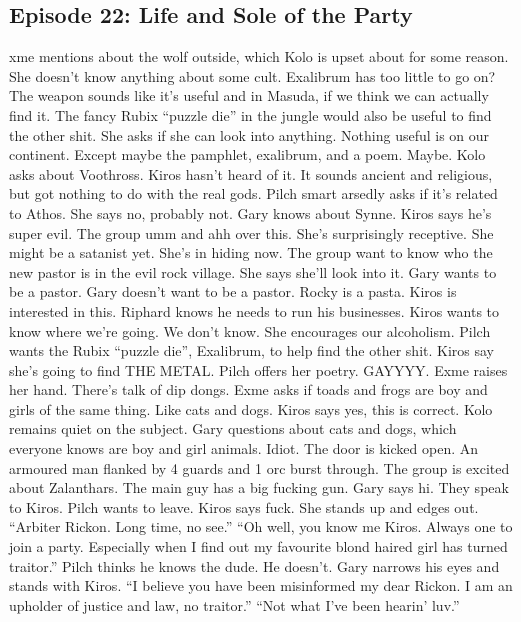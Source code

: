 \subsection{Episode 22: Life and Sole of the Party}
xme mentions about the wolf outside, which Kolo is upset about for some reason.\medskip
She doesn’t know anything about some cult. Exalibrum has too little to go on? The weapon sounds like it’s useful and in Masuda, if we think we can actually find it. The fancy Rubix “puzzle die” in the jungle would also be useful to find the other shit. She asks if she can look into anything. Nothing useful is on our continent. Except maybe the pamphlet, exalibrum, and a poem. Maybe.\medskip
Kolo asks about Voothross. Kiros hasn’t heard of it. It sounds ancient and religious, but got nothing to do with the real gods. Pilch smart arsedly asks if it’s related to Athos. She says no, probably not. Gary knows about Synne. Kiros says he’s super evil. The group umm and ahh over this. She’s surprisingly receptive. She might be a satanist yet.\medskip
She’s in hiding now. The group want to know who the new pastor is in the evil rock village. She says she’ll look into it. Gary wants to be a pastor. Gary doesn’t want to be a pastor. Rocky is a pasta. Kiros is interested in this. Riphard knows he needs to run his businesses.\medskip
Kiros wants to know where we’re going. We don’t know. She encourages our alcoholism. Pilch wants the Rubix “puzzle die”, Exalibrum, to help find the other shit. Kiros say she’s going to find THE METAL. Pilch offers her poetry. GAYYYY.\medskip
Exme raises her hand. There’s talk of dip dongs.\medskip
Exme asks if toads and frogs are boy and girls of the same thing. Like cats and dogs. Kiros says yes, this is correct. Kolo remains quiet on the subject. Gary questions about cats and dogs, which everyone knows are boy and girl animals. Idiot.\medskip
The door is kicked open. An armoured man flanked by 4 guards and 1 orc burst through.\medskip
The group is excited about Zalanthars.\medskip
The main guy has a big fucking gun. Gary says hi. They speak to Kiros. Pilch wants to leave. Kiros says fuck. She stands up and edges out.\medskip
“Arbiter Rickon. Long time, no see.”\medskip
“Oh well, you know me Kiros. Always one to join a party. Especially when I find out my favourite blond haired girl has turned traitor.”\medskip
Pilch thinks he knows the dude. He doesn’t. Gary narrows his eyes and stands with Kiros.\medskip
“I believe you have been misinformed my dear Rickon. I am an upholder of justice and law, no traitor.”\medskip
“Not what I’ve been hearin’ luv.”\medskip
